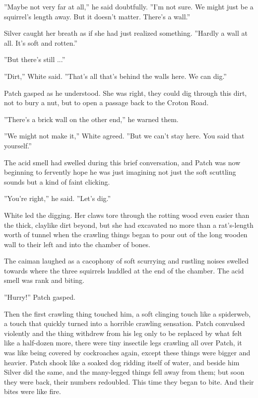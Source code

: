 \documentclass[12pt]{book}
\begin{document}
 ''Maybe not very far at all,'' he said doubtfully. ''I'm not sure. We might just be a squirrel's length away. But it doesn't matter. There's a wall.''\par
 Silver caught her breath as if she had just realized something. ''Hardly a wall at all. It's soft and rotten.''\par
 ''But there's still ...''\par
 ''Dirt,'' White said. ''That's all that's behind the walls here. We can dig.''\par
 Patch gasped as he understood. She was right, they could dig through this dirt, not to bury a nut, but to open a passage back to the Croton Road.\par
 ''There's a brick wall on the other end,'' he warned them.\par
 ''We might not make it,'' White agreed. ''But we can't stay here. You said that yourself.''\par
 The acid smell had swelled during this brief conversation, and Patch was now beginning to fervently hope he was just imagining not just the soft scuttling sounds but a kind of faint clicking.\par
 ''You're right,'' he said. ''Let's dig.''\par
 White led the digging. Her claws tore through the rotting wood even easier than the thick, claylike dirt beyond, but she had excavated no more than a rat's-length worth of tunnel when the crawling things began to pour out of the long wooden wall to their left and into the chamber of bones.\par
The caiman laughed as a cacophony of soft scurrying and rustling noises swelled towards where the three squirrels huddled at the end of the chamber. The acid smell was rank and biting.\par
 ''Hurry!'' Patch gasped.\par
Then the first crawling thing touched him, a soft clinging touch like a spiderweb, a touch that quickly turned into a horrible crawling sensation. Patch convulsed violently and the thing withdrew from his leg %
 only to be replaced by what felt like a half-dozen more, there were tiny insectile legs crawling all over Patch, it was like being covered by cockroaches again, except these things were bigger and heavier. Patch shook like a soaked dog ridding itself of water, and beside him Silver did the same, and the many-legged things fell away from them; but soon they were back, their numbers redoubled. This time they began to bite. And their bites were like fire.\par
\end{document}
